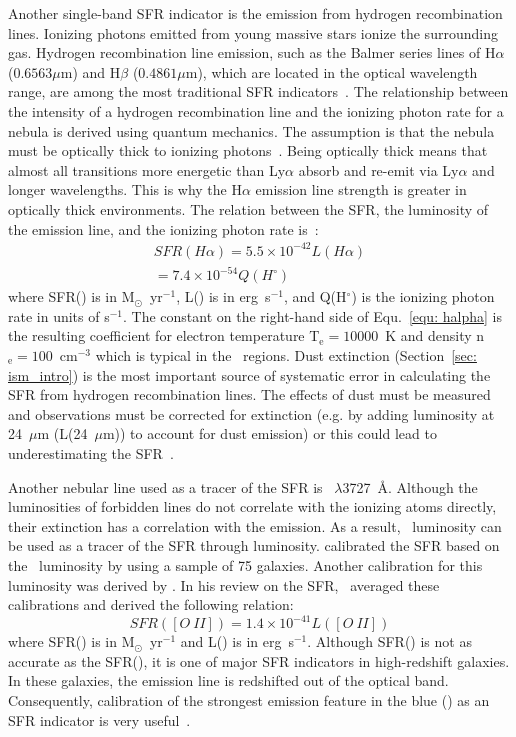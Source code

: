 Another single-band SFR indicator is the emission from hydrogen recombination lines. 
Ionizing photons emitted from young massive stars ionize the surrounding gas. Hydrogen recombination line emission, such as the Balmer series lines of H${\alpha}$ ($0.6563 \mu$m) and H${\beta}$ ($0.4861 \mu$m), which are located in the optical wavelength range, are among the most traditional SFR indicators~\citep{Kennicutt98a}. 
The relationship between the intensity of a hydrogen recombination line and the ionizing photon rate for a nebula is derived using quantum mechanics. 
The assumption is that the nebula must be optically thick to ionizing photons~\citep{Osterbrock06}.
Being optically thick means that almost all transitions more energetic than Ly${\alpha}$ absorb and re-emit via Ly${\alpha}$ and longer wavelengths.
This is why the H${\alpha}$ emission line strength is greater in optically thick environments. The relation between the SFR, the luminosity of the \halpha emission line, and the ionizing photon rate is~\citep[e.g.,][]{Osterbrock06, Kennicutt98b}:
\begin{align}
\label{equ: halpha}
SFR(H\alpha) = 5.5 \times 10^{-42}L(H\alpha) \\
                     = 7.4 \times 10^{-54}Q(H^{\circ})
\end{align}
where SFR(\halpha) is in M$_{\odot}$~yr$^{-1}$, L(\halpha) is in erg~s$^{-1}$, and Q(H$^{\circ}$) is the ionizing photon rate in units of s$^{-1}$.
The constant on the right-hand side of Equ.~\ref{equ: halpha} is the resulting coefficient for electron temperature T$_{\mathrm{e}}=10000$~K and density n$_{\mathrm{e}}=100$~cm$^{-3}$ which is typical in the \hii~regions.
Dust extinction (Section~\ref{sec: ism_intro}) is the most important source of systematic error in calculating the SFR from hydrogen recombination lines.
The effects of dust must be measured and \halpha observations must be corrected for extinction (e.g. by adding luminosity at 24~$\mu$m (L(24~$\mu$m)) to account for dust emission) or this could lead to underestimating the SFR~\citep{Kennicutt98b}.


Another nebular line used as a tracer of the SFR is \oii~$\lambda$3727~\AA. 
Although the luminosities of forbidden lines do not correlate with the ionizing atoms directly, their extinction has a correlation with the \halpha emission. 
As a result, \oii~luminosity can be used as a tracer of the SFR through \halpha luminosity. 
\cite{Gallagher89} calibrated the SFR based on the \oii~luminosity by using a sample of 75 galaxies. 
Another calibration for this luminosity was derived by \cite{Kennicutt92}. 
In his review on the SFR,~\citep{Kennicutt98b} averaged these calibrations and derived the following relation:
\begin{equation}
SFR([O\ II]) = 1.4 \times 10^{-41} L([O\ II])
\end{equation}  
where SFR(\oii) is in M$_{\odot}$~yr$^{-1}$ and L(\oii) is in erg~s$^{-1}$.
Although SFR(\oii) is not as accurate as the SFR(\halphafot), it is one of major SFR indicators in high-redshift galaxies.
In these galaxies, the \halpha emission line is redshifted out of the optical band.
Consequently, calibration of the strongest emission feature in the blue (\oii) as an SFR indicator is very useful~\citep{Kennicutt98b}.


